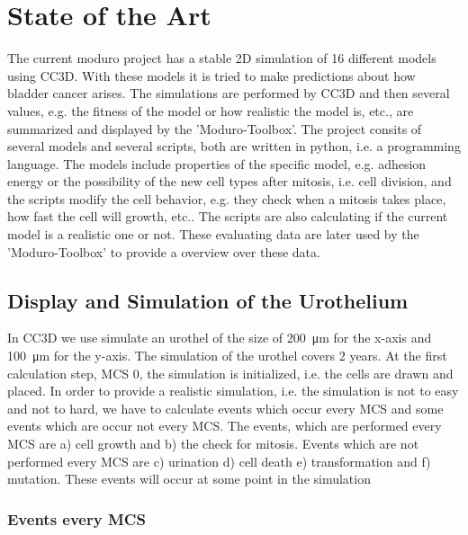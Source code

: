 \chapter{State of the Art}
The current moduro project has a stable 2D simulation of 16 different models using \ac{CC3D}. With these models it is tried to make predictions about how bladder cancer arises. The simulations are performed by \ac{CC3D} and then several values, e.g. the fitness of the model or how realistic the model is, etc., are summarized and displayed by the 'Moduro-Toolbox'. The project consits of several models and several scripts, both are written in python, i.e. a programming language. The models include properties of the specific model, e.g. adhesion energy or the possibility of the new cell types after mitosis, i.e. cell division, and the scripts modify the cell behavior, e.g. they check when a mitosis takes place, how fast the cell will growth, etc.. The scripts are also calculating if the current model is a realistic one or not. These evaluating data are later used by the 'Moduro-Toolbox' to provide a overview over these data.

\section{Display and Simulation of the Urothelium}
In \ac{CC3D} we use simulate an urothel of the size of \SI{200}{\micro\metre} for the x-axis and \SI{100}{\micro\metre} for the y-axis. The simulation of the urothel covers 2 years. At the first calculation step, \ac{MCS} 0, the simulation is initialized, i.e. the cells are drawn and placed. In order to provide a realistic simulation, i.e. the simulation is not to easy and not to hard, we have to calculate events which occur every \ac{MCS} and some events which are occur not every \ac{MCS}. The events, which are performed every \ac{MCS} are a) cell growth and b) the check for mitosis. Events which are not performed every \ac{MCS} are c) urination d) cell death e) transformation and f) mutation. These events will occur at some point in the simulation
\subsection{Events every \ac{MCS}}
